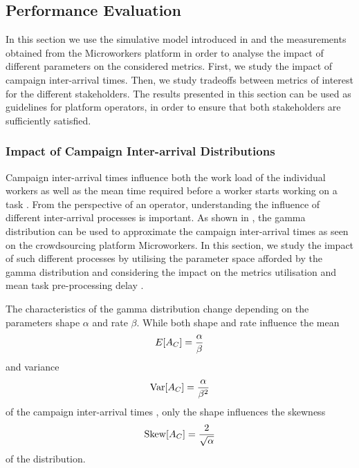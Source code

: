 \subsection{Performance Evaluation}\label{sec:cloud:crowdsourcing:performance_evaluation}

In this section we use the simulative model introduced in  and the measurements obtained from the Microworkers platform in order to analyse the impact of different parameters on the considered metrics.
First, we study the impact of campaign inter-arrival times.
Then, we study tradeoffs between metrics of interest for the different stakeholders.
The results presented in this section can be used as guidelines for platform operators, in order to ensure that both stakeholders are sufficiently satisfied.

\subsubsection*{Impact of Campaign Inter-arrival Distributions}

Campaign inter-arrival times \campaignIAT influence both the work load of the individual workers \workerUtilization as well as the mean time required before a worker starts working on a task \preTaskProcessingDelay.
From the perspective of an operator, understanding the influence of different inter-arrival processes is important.
As shown in , the gamma distribution can be used to approximate the campaign inter-arrival times \campaignIAT as seen on the crowdsourcing platform Microworkers.
In this section, we study the impact of such different processes by utilising the parameter space afforded by the gamma distribution and considering the impact on the metrics utilisation \workerUtilization and mean task pre-processing delay \preTaskProcessingDelay.

The characteristics of the gamma distribution change depending on the parameters shape \(\alpha\) and rate \(\beta\).
While both shape and rate influence the mean 
\begin{equation*}
E[A_C] =  \frac{\alpha}{\beta}
\end{equation*}
and variance 
\begin{equation*}
\operatorname{Var}[A_C] =  \frac{\alpha}{\beta^2}
\end{equation*}
of the campaign inter-arrival times \campaignIAT, only the shape influences the skewness 
\begin{equation*}
\operatorname{Skew}[A_C] =  \frac{2}{\sqrt{\alpha}}
\end{equation*}
of the distribution. 

